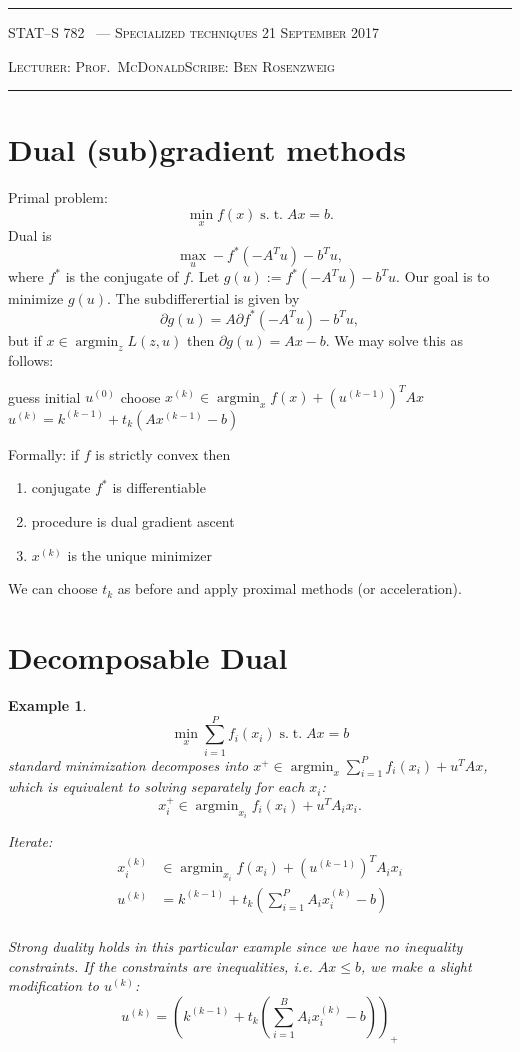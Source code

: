 \documentclass[10pt]{article}
\newcounter{lecnum}
\newtheorem{example}[ex]{Example}
\DeclareMathOperator*{\argmin}{argmin}
\newcommand{\st}{\ensuremath{\;\mathrm{s.}\;\mathrm{t.}\;}}
\newcommand{\lecturer}{Prof.\ McDonald}
\newcommand{\scribe}{Ben Rosenzweig}
\newcommand{\chtitle}{Specialized techniques}
\newcommand{\lecdate}{21 September 2017}
\begin{document}
\rule{6.5in}{1pt}

\textsc{STAT--S 782
        \hfill \thelecnum\ --- \chtitle
        \hfill \lecdate}

\textsc{Lecturer: \lecturer \hfill Scribe: \scribe}
\rule{6.5in}{1pt}

\section{Dual (sub)gradient methods}
Primal problem:
\[\min_xf(x) \st Ax=b.\]
Dual is \[\max_u -f^*(-A^Tu)-b^Tu,\]
where $f^*$ is the conjugate of $f$.  Let $g(u):=f^*(-A^Tu)-b^Tu$. Our goal is to minimize $g(u)$.
The subdifferertial is given by
\[
\partial g(u)= A\partial f^*(-A^Tu)-b^Tu, 
\]
but if $x\in\argmin_z L(z,u)$ then $\partial g(u)={Ax-b}$.  We may solve this as follows:

\begin{algorithmic}
\STATE  guess initial $u^{(0)}$
\STATE choose $x^{(k)}\in\argmin_xf(x)+(u^{(k-1)})^TAx$
\STATE $u^{(k)} = k^{(k-1)}+t_k\left(Ax^{(k-1)}-b\right)$
\ENDFOR
\end{algorithmic}

Formally: if $f$ is strictly convex then
\begin{enumerate}
\item conjugate $f^*$ is differentiable
\item procedure is dual gradient ascent
\item $x^{(k)}$ is the unique minimizer
\end{enumerate}
We can choose $t_k$ as before and apply proximal methods (or acceleration).

\section{Decomposable Dual}
\begin{example}
  \[ \min_x \sum_{i=1}^P f_i(x_i) \st Ax=b \]
  standard minimization decomposes into $x^+\in\argmin_x\sum_{i=1}^P f_i(x_i) + u^TAx$, which is equivalent to solving separately for each $x_i$:
  \[ x^+_i\in\argmin_{x_i}f_i(x_i)+u^TA_ix_i. \]
  
  Iterate:
\begin{align*}
x_i^{(k)}&\in\argmin_{x_i}f(x_i)+(u^{(k-1)})^TA_ix_i\\ 
u^{(k)} &= k^{(k-1)}+t_k\left(\sum_{i=1}^P A_ix_i^{(k)}-b \right)\\
\end{align*}

Strong duality holds in this particular example since we have no inequality constraints.
If the constraints are inequalities, i.e. $Ax\leq b$, we make a slight modification to $u^{(k)}$:
\[
u^{(k)} = \left(k^{(k-1)}+t_k\left(\sum_{i=1}^B A_ix_i^{(k)}-b \right)\right)_+
\]
\end{example}
\end{document}
